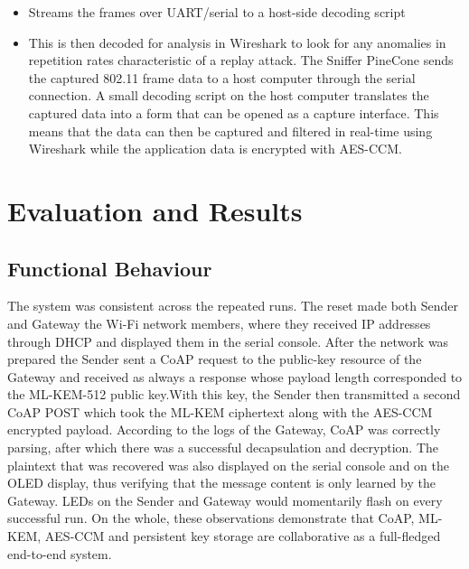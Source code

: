 \documentclass[USenglish,oneside,twocolumn]{article}
\begin{document}
\begin{enumerate}
\begin{itemize}
        \item Streams the frames over UART/serial to a host-side decoding script

        \item This is then decoded for analysis in Wireshark to look for any anomalies in repetition rates characteristic of a replay attack. The Sniffer PineCone sends the captured 802.11 frame data to a host computer through the serial connection. A small decoding script on the host computer translates the captured data into a form that can be opened as a capture interface. This means that the data can then be captured and filtered in real-time using Wireshark while the application data is encrypted with AES-CCM. 
    \end{itemize}

    \end{enumerate}

    \section{Evaluation and Results}
    \subsection{Functional Behaviour}
    The system was consistent across the repeated runs. The reset made both Sender and Gateway the Wi-Fi network members, where they received IP addresses through DHCP and displayed them in the serial console. After the network was prepared the Sender sent a CoAP request to the public-key resource of the Gateway and received as always a response whose payload length corresponded to the ML-KEM-512 public key.With this key, the Sender then transmitted a second CoAP POST which took the ML-KEM ciphertext along with the AES-CCM encrypted payload. According to the logs of the Gateway, CoAP was correctly parsing, after which there was a successful decapsulation and decryption. The plaintext that was recovered was also displayed on the serial console and on the OLED display, thus verifying that the message content is only learned by the Gateway. LEDs on the Sender and Gateway would momentarily flash on every successful run. On the whole, these observations demonstrate that CoAP, ML-KEM, AES-CCM and persistent key storage are collaborative as a full-fledged end-to-end system.
\end{document}
